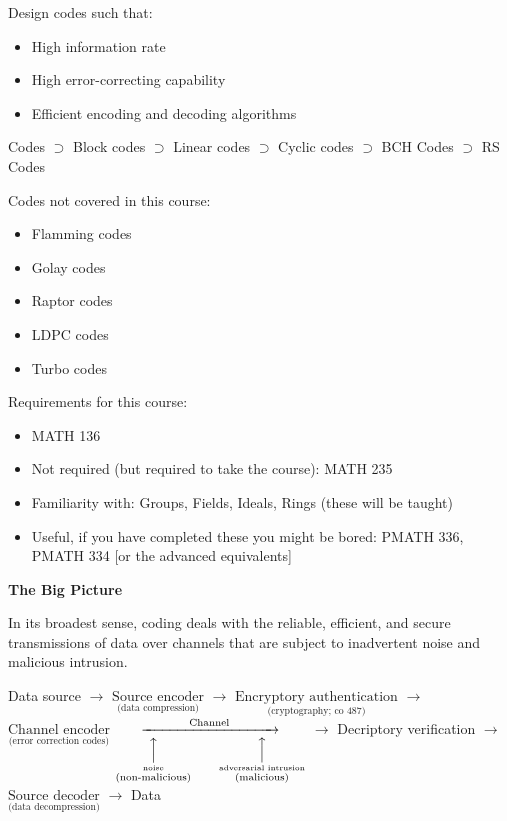 Design codes such that:
\begin{itemize}
    \item High information rate
    \item High error-correcting capability
    \item Efficient encoding and decoding algorithms
\end{itemize}

Codes $ \supset $ Block codes $ \supset $  Linear codes
$ \supset $  Cyclic codes $ \supset $ BCH Codes
$ \supset $ RS Codes

Codes not covered in this course:
\begin{itemize}
    \item Flamming codes
    \item Golay codes
    \item Raptor codes
    \item LDPC codes
    \item Turbo codes
\end{itemize}

Requirements for this course:
\begin{itemize}
    \item MATH 136
    \item Not required (but required to take the course): MATH 235
    \item Familiarity with: Groups, Fields, Ideals, Rings (these will be taught)
    \item Useful, if you have completed these you might be bored:
          PMATH 336, PMATH 334 [or the advanced equivalents]
\end{itemize}

\textbf{The Big Picture}

In its broadest sense, coding deals with the reliable, efficient, and secure
transmissions of data over channels that are subject to inadvertent noise and
malicious intrusion.

Data source
$ \rightarrow $
$ \underset{\text{(data compression)}}{\text{Source encoder}} $
$ \rightarrow $
$ \underset{\text{(cryptography; co 487)}}{\text{Encryptory authentication}} $
$ \rightarrow $
$ \underset{\text{(error correction codes)}}{\text{Channel encoder}} $
$ \underset
    {
        \overset{\Big\uparrow}{\overset{\text{noise}}{\text{(non-malicious)}}}\qquad
        \overset{\Big\uparrow}{\overset{\text{adversarial intrusion}}{\text{(malicious)}}}
    }
    {\xrightarrow{\text{\qquad\qquad Channel\qquad\qquad}}} $
$ \rightarrow $
Decriptory verification
$ \rightarrow $
$ \underset{\text{(data decompression)}}{\text{Source decoder}}  $
$ \rightarrow $
Data
